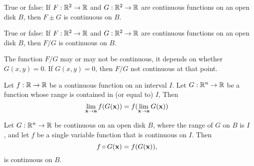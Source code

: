 \documentclass{ximera}
\begin{document}
\begin{question}
  True or false: If $F:\mathbb R^2\to\mathbb R$ and $G:\mathbb R^2\to\mathbb R$ are continuous
  functions on an open disk $B$, then $F\pm G$ is continuous on $B$.
  \begin{prompt}
    \begin{multipleChoice}
  \end{multipleChoice}
  \end{prompt}
\end{question}

\begin{question}
  True or false: If $F:\mathbb R^2\to\mathbb R$ and $G:\mathbb R^2\to\mathbb R$ are continuous
  functions on an open disk $B$, then $F/G$ is continuous on $B$.
  \begin{prompt}
    \begin{multipleChoice}
    \end{multipleChoice}
    \begin{feedback}
      The function $F/G$ may or may not be continuous, it depends on
      whether $G(x,y)=0$. If $G(x,y)=0$, then $F/G$ not continuous at that point.
    \end{feedback}
  \end{prompt}
\end{question}


\begin{theorem}
  Let $f:\mathbb R\to\mathbb R$ be a continuous function on an interval $I$. Let
  $G:\mathbb R^n\to \mathbb R$ be a function whose range is contained in (or equal
  to) $I$, Then
  \[
  \lim_{\mathbf{x}\to\mathbf{a}} f( G(\mathbf{x})) = f(\lim_{\mathbf{x}\to\mathbf{a}}G(\mathbf{x}))
  \]
\end{theorem}


\begin{corollary}
  Let $G:\mathbb R^n\to \mathbb R$ be continuous on an open disk $B$, where the
  range of $G$ on $B$ is $I$, and let $f$ be a single variable
  function that is continuous on $I$. Then
  \[
  f\circ G(\mathbf{x}) =f(G(\mathbf{x})),
  \]
  is continuous on $B$.
\end{corollary}
\end{document}
